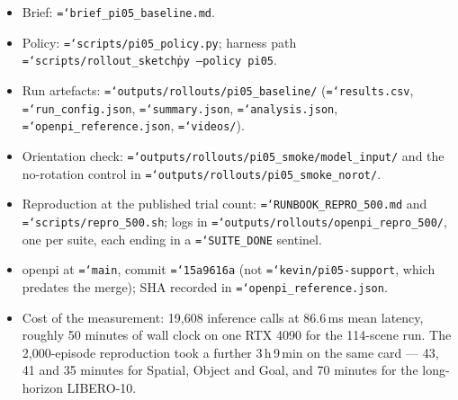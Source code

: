 \documentclass[11pt,a4paper]{article}
\newcommand{\code}[1]{\texttt{\small\hyphenchar\font=`\-\relax #1}}
\begin{document}
\begin{itemize}
  \item Brief: \code{brief\_pi05\_baseline.md}.
  \item Policy: \code{scripts/pi05\_policy.py}; harness path
    \code{scripts/rollout\_sketch\.py --policy pi05}.
  \item Run artefacts: \code{outputs/rollouts/pi05\_baseline/}
    (\code{results.csv}, \code{run\_config.json}, \code{summary.json},
    \code{analysis.json}, \code{openpi\_reference.json}, \code{videos/}).
  \item Orientation check: \code{outputs/rollouts/pi05\_smoke/model\_input/} and
    the no-rotation control in \code{outputs/rollouts/pi05\_smoke\_norot/}.
  \item Reproduction at the published trial count: \code{RUNBOOK\_REPRO\_500.md}
    and \code{scripts/repro\_500.sh}; logs in
    \code{outputs/rollouts/openpi\_repro\_500/}, one per suite, each ending in a
    \code{SUITE\_DONE} sentinel.
  \item openpi at \code{main}, commit \code{15a9616a} (not
    \code{kevin/pi05-support}, which predates the merge); SHA recorded in
    \code{openpi\_reference.json}.
  \item Cost of the measurement: 19{,}608 inference calls at 86.6\,ms mean
    latency, roughly 50 minutes of wall clock on one RTX 4090 for the 114-scene
    run. The 2{,}000-episode reproduction took a further 3\,h\,9\,min on the same
    card --- 43, 41 and 35 minutes for Spatial, Object and Goal, and 70 minutes for
    the long-horizon LIBERO-10.
\end{itemize}
\end{document}
